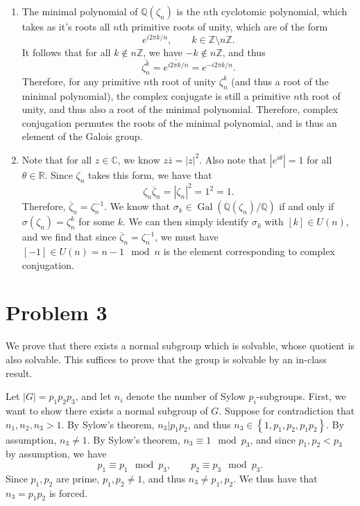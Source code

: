 \documentclass[11pt, letterpaper]{article}
\begin{document}
\begin{enumerate}
		For any $x\in\mathbb{Q} (\zeta _n)\cap \mathbb{R} $, we have that the conjugate $\overline{x} =x$, since $x\in\mathbb{R} $. It follows that $x$ is an element of the fixed field of the complex conjugate, which we found to be $\mathbb{Q} (\zeta _n+\overline{\zeta } _n)$ in the previous problem. Therefore, $\mathbb{Q} (\zeta _n)\cap \mathbb{R} \subseteq \mathbb{Q} (\zeta _n+\overline{\zeta } _n)$.
	\item The minimal polynomial of $\mathbb{Q} (\zeta _n)$ is the $n$th cyclotomic polynomial, which takes as it's roots all $n$th primitive roots of unity, which are of the form
		\[
			e^{i2\pi k/n} ,\qquad k\in\mathbb{Z} \setminus n\mathbb{Z} 
		.\]
		It follows that for all $k\notin n\mathbb{Z} $, we have $-k\notin n\mathbb{Z} $, and thus 
		\[
			\overline{\zeta_n^k } =\overline{e^{i2\pi k/n} } =e^{-i2\pi k/ n} 
		.\]
		Therefore, for any primitive $n$th root of unity $\zeta_n^k$ (and thus a root of the minimal polynomial), the complex conjugate is still a primitive $n$th root of unity, and thus also a root of the minimal polynomial. Therefore, complex conjugation permutes the roots of the minimal polynomial, and is thus an element of the Galois group.
	\item  Note that for all $z\in\mathbb{C} $, we know $z \overline{z} =\left| z \right| ^2$. Also note that $\left| e^{i\theta }  \right| =1$ for all $\theta \in\mathbb{R} $. Since $\zeta _n$ takes this form, we have that
		\[
			\zeta _n \overline{\zeta } _n = \left| \zeta _n \right| ^2 = 1^2=1
		.\]
		Therefore, $\overline{\zeta } _n=\zeta^{-1} _n$. We know that $\sigma_k \in \operatorname{Gal} (\mathbb{Q} (\zeta _n) / \mathbb{Q} )$ if and only if $\sigma (\zeta _n)=\zeta_n ^k$ for some $k$. We can then simply identify $\sigma _k$ with $[k]\in U(n)$, and we find that since $\overline{\zeta } _n=\zeta ^{-1} _n$, we must have $[-1]\in U(n)=n-1 \mod{n}$ is the element corresponding to complex conjugation.
\end{enumerate}

\section*{Problem 3}
We prove that there exists a normal subgroup which is solvable, whose quotient is also solvable. This suffices to prove that the group is solvable by an in-class result.

Let $\left| G \right| =p_1p_2p_3$, and let $n_i$ denote the number of Sylow $p_i$-subgroups. First, we want to show there exists a normal subgroup of $G$. Suppose for contradiction that $n_1,n_2,n_3>1$. By Sylow's theorem, $n_3|p_1p_2$, and thus $n_3\in \left\{ 1,p_1,p_2,p_1p_2 \right\} $. By assumption, $n_3\neq 1$. By Sylow's theorem, $n_3 \equiv 1\mod{p_3}$, and since $p_1,p_2<p_3$ by assumption, we have
\[
	p_1 \equiv p_1 \mod{p_3},\qquad p_2 \equiv p_3\mod{p_3}
.\]
Since $p_1,p_2$ are prime, $p_1,p_2\neq 1$, and thus $n_3 \neq p_1,p_2$. We thus have that $n_3=p_1p_2$ is forced.
\end{document}
